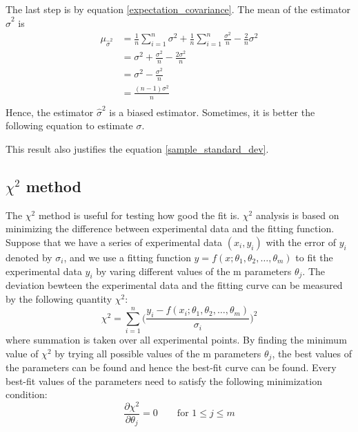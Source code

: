 \documentclass[12pt,a4paper]{report}
\begin{document}
The last step is by equation \ref{expectation_covariance}. The mean of the estimator $\hat{\sigma}^2$ is
\begin{align*}
\mu_{\hat{\sigma}^2}
&= \frac{1}{n} \sum_{i = 1}^{n} \sigma^2
+  \frac{1}{n} \sum_{i = 1}^{n} \frac{\sigma^2}{n}
-  \frac{2}{n} \sigma^2 \\
&= \sigma^2
+  \frac{\sigma^2}{n}
-  \frac{2\sigma^2}{n} \\
&= \sigma^2 - \frac{\sigma^2}{n} \\
&= \frac{(n-1)\sigma^2}{n} \\
\end{align*}
Hence, the estimator $\hat{\sigma}^2$ is a biased estimator. Sometimes, it is better the following equation to estimate $\sigma$.

This result also justifies the equation \ref{sample_standard_dev}.

\subsection{$\chi^2$ method}
The $\chi^2$ method is useful for testing how good the fit is.
$\chi^2$ analysis \cite{stat_2, BAKER1984437, reduced_chi_squared} is based on minimizing the difference between experimental data and the fitting function. Suppose that we have a series of experimental data $(x_i,y_i)$ with the error of $y_i$ denoted by $\sigma_i$, and we use a fitting function $y = f(x;\theta_1,\theta_2,\dots,\theta_m)$ to fit the experimental data $y_i$ by varing different values of the m parameters $\theta_j$. The deviation bewteen the experimental data and the fitting curve can be measured by the following quantity $\chi^2$:
\begin{equation} \label{chi_square_formula}
\chi^2 = \sum_{i = 1}^{n} \Big ( \frac{y_i - f(x_i;\theta_1,\theta_2,\dots,\theta_m)}{\sigma_i} \Big )^2
\end{equation}
where summation is taken over all experimental points.
By finding the minimum value of $\chi^2$ by trying all possible values of the m parameters $\theta_j$, the best values of the parameters can be found and hence the best-fit curve can be found.
Every best-fit values of the parameters need to satisfy the following minimization condition:
\begin{equation} \label{chi_minimisation_condition}
\frac{\partial \chi^2}{\partial \theta_j} = 0 \qquad \text{for } 1 \leq  j \leq m
\end{equation}
\end{document}

